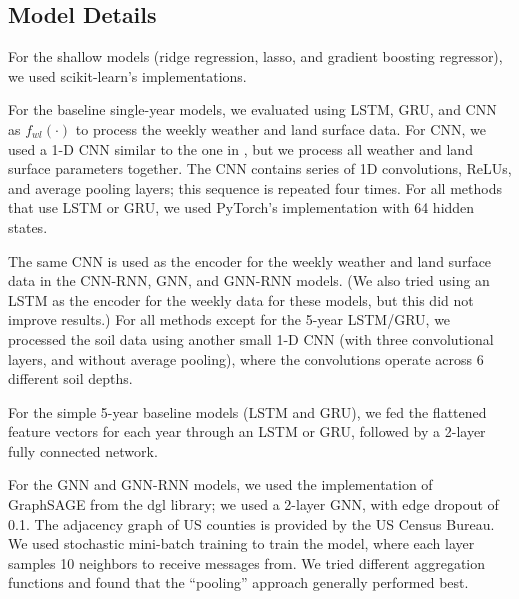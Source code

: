 \subsection{Model Details}

For the shallow models (ridge regression, lasso, and gradient boosting regressor), we used scikit-learn's implementations. 

For the baseline single-year models, we evaluated using LSTM, GRU, and CNN as $f_{wl}(\cdot)$ to process the weekly weather and land surface data. For CNN, we used a 1-D CNN similar to the one in \cite{khaki2020cnn}, but we process all weather and land surface parameters together. The CNN contains series of 1D convolutions, ReLUs, and average pooling layers; this sequence is repeated four times.  For all methods that use LSTM or GRU, we used PyTorch's implementation with 64 hidden states.


The same CNN is used as the encoder for the weekly weather and land surface data in the CNN-RNN, GNN, and GNN-RNN models. (We also tried using an LSTM as the encoder for the weekly data for these models, but  this did not improve results.) For all methods except for the 5-year LSTM/GRU, we processed the soil data using another small 1-D CNN (with three convolutional layers, and without average pooling), where the convolutions operate across 6 different soil depths.


For the simple 5-year baseline models (LSTM and GRU), we fed the flattened feature vectors for each year through an LSTM or GRU, followed by a 2-layer fully connected network.


For the GNN and GNN-RNN models, we used the implementation of GraphSAGE from the dgl library; we used a 2-layer GNN, with edge dropout of 0.1. The adjacency graph of US counties is provided by the US Census Bureau. We used stochastic mini-batch training to train the model, where each layer samples 10 neighbors to receive messages from. We tried different aggregation functions and found that the ``pooling'' approach generally performed best.


